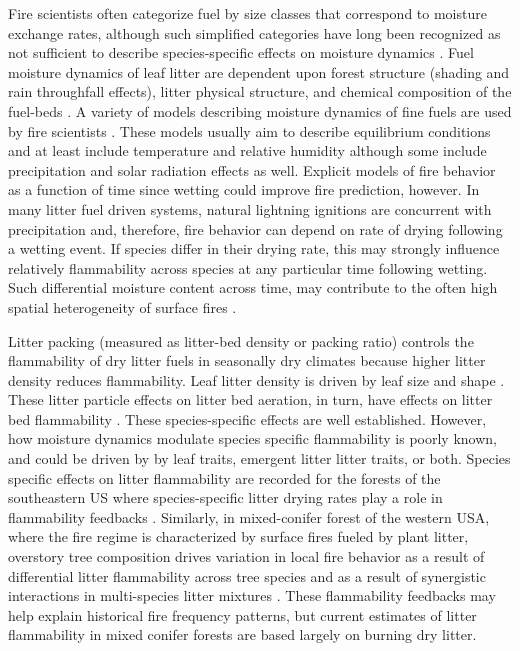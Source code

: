 \documentclass[letterpaper,12pt]{article}
\begin{document}
Fire scientists often categorize fuel by size classes that correspond to
moisture exchange rates, although such simplified categories have long been
recognized as not sufficient to describe species-specific effects on moisture
dynamics \citep{Anderson-1985}. Fuel moisture dynamics of leaf litter are
dependent upon forest structure (shading and rain throughfall effects), litter
physical structure, and chemical composition of the fuel-beds
\citep{Nelson+Hiers-2008, Matthews-2014, Kreye_Hiers_etal-2018}. A variety of
models describing moisture dynamics of fine fuels are used by fire scientists
\citep{Viney-1991, Nelson-2000, Catchpole+Catchpole+etal-2001}. These models
usually aim to describe equilibrium conditions and at least include temperature
and relative humidity although some include precipitation and solar radiation
effects as well. Explicit models of fire behavior as a function of time since
wetting could improve fire prediction, however. In many litter fuel driven
systems, natural lightning ignitions are concurrent with precipitation and,
therefore, fire behavior can depend on rate of drying following a wetting
event. If species differ in their drying rate, this may strongly influence
relatively flammability across species at any particular time following
wetting. Such differential moisture content across time, may contribute to the
often high spatial heterogeneity of surface fires
\citep{Knapp_Schwilk_etal-2006, Kreye_Hiers_etal-2018}.



Litter packing (measured as litter-bed density or packing ratio) controls the
flammability of dry litter fuels in seasonally dry climates because higher
litter density reduces flammability. Leaf litter density is driven by leaf size
and shape \citep{Fonda+Belanger+etal-1998, Scarff+Westoby-2006,
  Kane+Varner+etal-2008}. These litter particle effects on litter bed aeration,
in turn, have effects on litter bed flammability
\citep{Ganteaume+Marielle+etal-2011, Schwilk+Caprio-2011,
  Kreye+Varner+etal-2013}. These species-specific effects are well established.
However, how moisture dynamics modulate species specific flammability is poorly
known, and could be driven by by leaf traits, emergent litter litter traits, or
both. Species specific effects on litter flammability are recorded for the
forests of the southeastern US \citep{Nowacki+Abrams-2008} where
species-specific litter drying rates play a role in flammability feedbacks
\citep{Kreye+Varner+etal-2013}. Similarly, in mixed-conifer forest of the
western USA, where the fire regime is characterized by surface fires fueled by
plant litter, overstory tree composition drives variation in local fire
behavior \citep{Schwilk+Caprio-2011} as a result of differential litter
flammability across tree species and as a result of synergistic interactions in
multi-species litter mixtures \citep{Magalhaes+Schwilk-2012}. These
flammability feedbacks may help explain historical fire frequency patterns, but
current estimates of litter flammability in mixed conifer forests are based
largely on burning dry litter.
\end{document}
